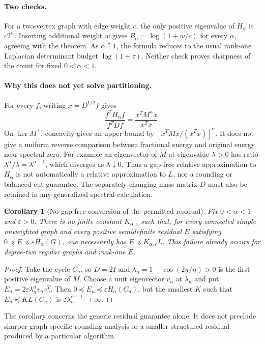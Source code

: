\documentclass[11pt]{article}
\newtheorem{corollary}{Corollary}
\begin{document}
\paragraph{Two checks.}
For a two-vertex graph with edge weight $c$, the only positive eigenvalue
of $H_\alpha$ is $c2^\alpha$. Inserting additional weight $w$ gives
$B_\alpha=\log(1+w/c)$ for every $\alpha$, agreeing with the theorem.
As $\alpha\uparrow1$, the formula reduces to the usual rank-one
Laplacian determinant budget $\log(1+\tau)$. Neither check proves
sharpness of the count for fixed $0<\alpha<1$.

\paragraph{Why this does not yet solve partitioning.}
For every $f$, writing $x=D^{1/2}f$ gives
\[
 \frac{f^TH_\alpha f}{f^TDf}
 =\frac{x^TM^\alpha x}{x^Tx}.
\]
On $\ker M^\perp$, concavity gives an upper bound by
$[x^TMx/(x^Tx)]^\alpha$. It does not give a uniform reverse comparison
between fractional energy and original energy near spectral zero.
For example an eigenvector of $M$ at eigenvalue $\lambda>0$ has ratio
$\lambda^\alpha/\lambda=\lambda^{\alpha-1}$, which diverges as
$\lambda\downarrow0$. Thus a gap-free relative approximation to
$H_\alpha$ is not automatically a relative approximation to $L$, nor a
rounding or balanced-cut guarantee. The separately changing mass matrix
$D$ must also be retained in any generalized spectral calculation.

\begin{corollary}[No gap-free conversion of the permitted residual]
Fix $0<\alpha<1$ and $\varepsilon>0$. There is no finite constant
$K_{\alpha,\varepsilon}$ such that, for every connected simple unweighted
graph and every positive semidefinite residual $E$ satisfying
$0\preceq E\preceq\varepsilon H_\alpha(G)$, one necessarily has
$E\preceq K_{\alpha,\varepsilon}L$.
This failure already occurs for degree-two regular graphs and rank-one $E$.
\end{corollary}
\begin{proof}
Take the cycle $C_n$, so $D=2I$ and
$\lambda_n=1-\cos(2\pi/n)>0$ is the first positive eigenvalue of $M$.
Choose a unit eigenvector $v_n$ at $\lambda_n$ and put
$E_n=2\varepsilon\lambda_n^\alpha v_nv_n^T$.
Then $0\preceq E_n\preceq\varepsilon H_\alpha(C_n)$, but the
smallest $K$ such that $E_n\preceq K L(C_n)$ is
$\varepsilon\lambda_n^{\alpha-1}\to\infty$.
\end{proof}
The corollary concerns the generic residual guarantee alone. It does not
preclude sharper graph-specific rounding analysis or a smaller structured
residual produced by a particular algorithm.
\end{document}
